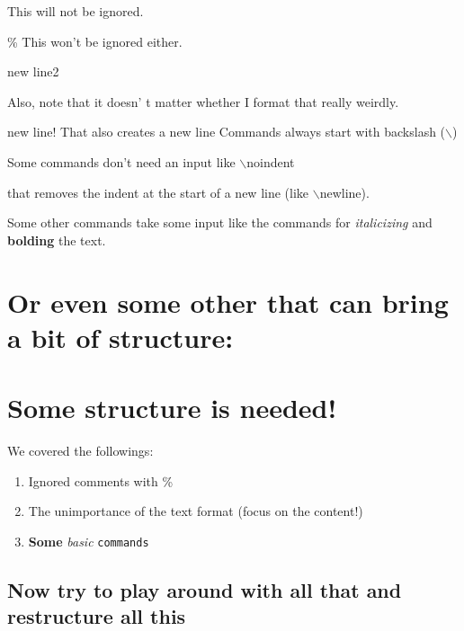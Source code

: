 \documentclass{article} %
\begin{document}





This will not be ignored.




\% This won't be ignored either. %




new line2



Also, 
note
that
it doesn'
t
matter                   whether
I
    format that really weirdly.

new line!
\newline
That also creates a new line
\newline
Commands always start with backslash ($\backslash$) %

Some commands don't need an input like $\backslash$noindent %

\noindent that removes the indent at the start of a new line (like $\backslash$newline).


Some other commands take some input like the commands for \textit{italicizing} and \textbf{bolding} the text.
\section{Or even some other that can bring a bit of structure:}
\section{Some structure is needed!}
We covered the followings:

\begin{enumerate} %
\item Ignored comments with \%
\item The unimportance of the text format (focus on the content!)
\item \textbf{Some} \textit{basic} \texttt{commands} %
\end{enumerate}

\subsection*{Now try to play around with all that and restructure all this} %
\end{document}
